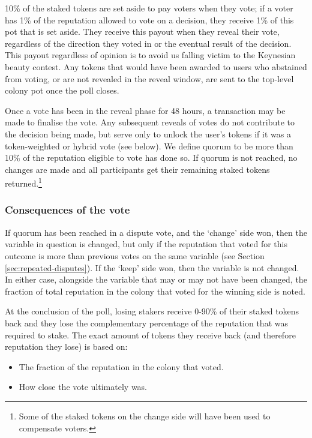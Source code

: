 10\% of the staked tokens are set aside to pay voters when they vote; if a voter has 1\% of the reputation allowed to vote on a decision, they receive 1\% of this pot that is set aside. They receive this payout when they reveal their vote, regardless of the direction they voted in or the eventual result of the decision. This payout regardless of opinion is to avoid us falling victim to the Keynesian beauty contest\cite{KeynesianBeauty}. Any tokens that would have been awarded to users who abstained from voting, or are not revealed in the reveal window, are sent to the top-level colony pot once the poll closes.

Once a vote has been in the reveal phase for 48 hours, a transaction may be made to finalise the vote. Any subsequent reveals of votes do not contribute to the decision being made, but serve only to unlock the user's tokens if it was a token-weighted or hybrid vote (see below). We define quorum to be more than 10\% of the reputation eligible to vote has done so. If quorum is not reached, no changes are made and all participants get their remaining staked tokens returned.\footnote{Some of the staked tokens on the change side will have been used to compensate voters.}

\subsubsection{Consequences of the vote}
If quorum has been reached in a dispute vote, and the `change' side won, then the variable in question is changed, but only if the reputation that voted for this outcome is more than previous votes on the same variable (see Section \ref{sec:repeated-disputes}). If the `keep' side won, then the variable is not changed. In either case, alongside the variable that may or may not have been changed, the fraction of total reputation in the colony that voted for the winning side is noted. 

At the conclusion of the poll, losing stakers receive 0-90\% of their staked tokens back and they lose the  complementary percentage of the reputation that was required to stake. The exact amount of tokens they receive back (and therefore reputation they lose) is based on:

\begin{itemize}
 \item The fraction of the reputation in the colony that voted.
 \item How close the vote ultimately was.
\end{itemize}

